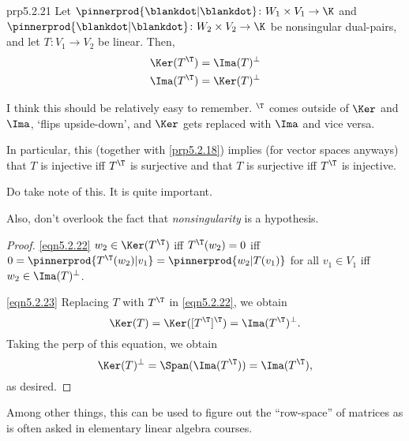 \begin{prp}{}{prp5.2.21}
	Let $\pinnerprod{\blankdot |\blankdot}\colon W_1\times V_1\rightarrow \K$ and $\pinnerprod{\blankdot |\blankdot}\colon W_2\times V_2\rightarrow \K$ be nonsingular dual-pairs, and let $T\colon V_1\rightarrow V_2$ be linear.  Then,
	\begin{align}
	\Ker (T^{\T}) & =\Ima (T)^{\perp}\label{eqn5.2.22} \\
	\Ima (T^{\T}) & =\Ker (T)^{\perp}\label{eqn5.2.23}
	\end{align}
	\begin{rmk}
		I think this should be relatively easy to remember.  $^{\T}$ comes outside of $\Ker $ and $\Ima$, `flips upside-down', and $\Ker$ gets replaced with $\Ima$ and vice versa.
	\end{rmk}
	\begin{rmk}
		In particular, this (together with \cref{prp5.2.18}) implies (for vector spaces anyways) that $T$ is injective iff $T^{\T}$ is surjective and that $T$ is surjective iff $T^{\T}$ is injective.
	\end{rmk}
	\begin{rmk}
		Do take note of this.  It is quite important.
		
		Also, don't overlook the fact that \emph{nonsingularity} is a hypothesis.
	\end{rmk}
	\begin{proof}
		\eqref{eqn5.2.22} $w_2 \in \Ker (T^{\T})$ iff $T^{\T}(w_2)=0$ iff $0=\pinnerprod{T^{\T}(w_2)|v_1}=\pinnerprod{w_2|T(v_1)}$ for all $v_1\in V_1$ iff $w_2\in \Ima (T)^{\perp}$.
		
		\blni
		\eqref{eqn5.2.23} Replacing $T$ with $T^{\T}$ in \eqref{eqn5.2.22}, we obtain
		\begin{equation}
		\Ker (T)=\Ker ([T^{\T}]^{\T})=\Ima (T^{\T})^{\perp}.
		\end{equation}
		Taking the perp of this equation, we obtain
		\begin{equation}
		\Ker (T)^{\perp}=\Span (\Ima (T^{\T}))=\Ima (T^{\T}),
		\end{equation}
		as desired.
	\end{proof}
\end{prp}
Among other things, this can be used to figure out the ``row-space'' of matrices as is often asked in elementary linear algebra courses.
